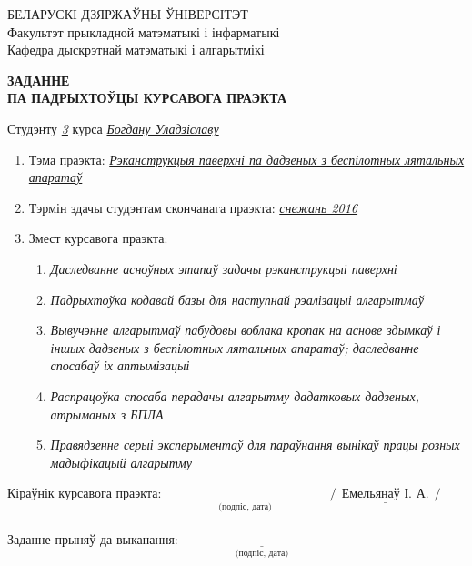 \documentclass[12pt,a4paper]{extarticle}
\begin{document}
	\begin{center}
			БЕЛАРУСКІ ДЗЯРЖАЎНЫ ЎНІВЕРСІТЭТ \\
			Факультэт прыкладной матэматыкі і інфарматыкі \\
			Кафедра дыскрэтнай матэматыкі і алгарытмікі \\
	\end{center}
	\vspace{30pt}
	\begin{center}
		\textbf{
			ЗАДАННЕ \\
			ПА ПАДРЫХТОЎЦЫ КУРСАВОГА ПРАЭКТА \\
		}
	\end{center}
	\vspace{10pt}
	Студэнту \underline{\hspace{5pt}\textit{3}\hspace{5pt}} курса \underline{\hspace{120pt}\textit{Богдану Уладзіславу}\hspace{120pt}} \\
	\renewcommand{\labelenumii}{\arabic{enumi}.\arabic{enumii}.}
	\begin{enumerate}
		\item Тэма праэкта: \underline{\textit{Рэканструкцыя паверхні па дадзеных з беспілотных лятальных}} \\
		\underline{\textit{апаратаў}}
		\item Тэрмін здачы студэнтам скончанага праэкта: \underline{\textit{снежань 2016}}
		\item Змест курсавога праэкта:
		\begin{enumerate}
			\item \textit{Даследванне асноўных этапаў задачы рэканструкцыі паверхні}
			\item \textit{Падрыхтоўка кодавай базы для наступнай рэалізацыі алгарытмаў}
			\item \textit{Вывучэнне алгарытмаў пабудовы воблака кропак на аснове здымкаў і іншых дадзеных з беспілотных лятальных апаратаў; даследванне спосабаў іх аптымізацыі}
			\item \textit{Распрацоўка спосаба перадачы алгарытму дадатковых дадзеных, атрыманых з БПЛА}
			\item \textit{Правядзенне серыі эксперыментаў для параўнання вынікаў працы розных мадыфікацый алгарытму}
		\end{enumerate}
	\end{enumerate} 
	\vspace{30pt}
	Кіраўнік курсавога праэкта: $\underset{\text{(подпіс, дата)}}{\underline{\hspace{150pt}}} \hspace{5pt}  /\underline{\hspace{5pt}\textit{Емельянаў І. А.}\hspace{5pt}}/$ \\
	\vspace{15pt} \\
	Заданне прыняў да выканання: $\underset{\text{(подпіс, дата)}}{\underline{\hspace{150pt}}}$
\end{document}
